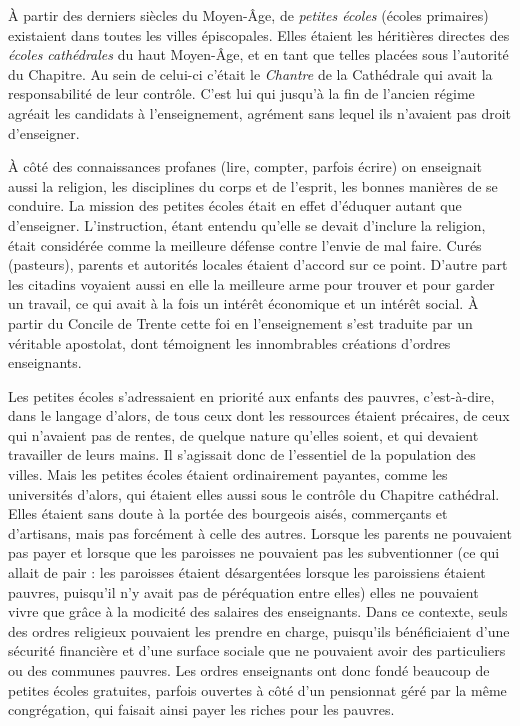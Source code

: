  À partir des derniers siècles du Moyen-Âge, de \emph{petites écoles} (écoles primaires) existaient dans toutes les villes épiscopales. Elles étaient les héritières directes des \emph{écoles cathédrales} du haut Moyen-Âge, et en tant que telles placées sous l'autorité du Chapitre. Au sein de celui-ci c'était le \emph{Chantre} de la Cathédrale qui avait la responsabilité de leur contrôle. C'est lui qui jusqu'à la fin de l'ancien régime agréait les candidats à l'enseignement, agrément sans lequel ils n'avaient pas droit d'enseigner. 

 À côté des connaissances profanes (lire, compter, parfois écrire) on enseignait aussi la religion, les disciplines du corps et de l'esprit, les bonnes manières de se conduire. La mission des petites écoles était en effet d'éduquer autant que d'enseigner. L'instruction, étant entendu qu'elle se devait d'inclure la religion, était considérée comme la meilleure défense contre l'envie de mal faire. Curés (pasteurs), parents et autorités locales étaient d'accord sur ce point. D'autre part les citadins voyaient aussi en elle la meilleure arme pour trouver et pour garder un travail, ce qui avait à la fois un intérêt économique et un intérêt social. À partir du Concile de Trente cette foi en l'enseignement s'est traduite par un véritable apostolat, dont témoignent les innombrables créations d'ordres enseignants. 

 Les petites écoles s'adressaient en priorité aux enfants des pauvres, c'est-à-dire, dans le langage d'alors, de tous ceux dont les ressources étaient précaires, de ceux qui n'avaient pas de rentes, de quelque nature qu'elles soient, et qui devaient travailler de leurs mains. Il s'agissait donc de l'essentiel de la population des villes. Mais les petites écoles étaient ordinairement payantes, comme les universités d'alors, qui étaient elles aussi sous le contrôle du Chapitre cathédral. Elles étaient sans doute à la portée des bourgeois aisés, commerçants et d'artisans, mais pas forcément à celle des autres. Lorsque les parents ne pouvaient pas payer et lorsque que les paroisses ne pouvaient pas les subventionner (ce qui allait de pair : les paroisses étaient désargentées lorsque les paroissiens étaient pauvres, puisqu'il n'y avait pas de péréquation entre elles) elles ne pouvaient vivre que grâce à la modicité des salaires des enseignants. Dans ce contexte, seuls des ordres religieux pouvaient les prendre en charge, puisqu'ils bénéficiaient d'une sécurité financière et d'une surface sociale que ne pouvaient avoir des particuliers ou des communes pauvres. Les ordres enseignants ont donc fondé beaucoup de petites écoles gratuites, parfois ouvertes à côté d'un pensionnat géré par la même congrégation, qui faisait ainsi payer les riches pour les pauvres. 

